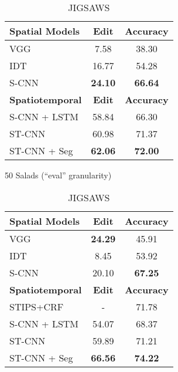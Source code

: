 \documentclass[runningheads]{llncs}
\begin{document}
\setcounter{table}{0}
\begin{table}[t]
\begin{minipage}[t]{0.5\linewidth}
		\begin{center}
\begin{tabular}{| l | c | c |}
				\hline
				\textbf{Spatial Models}  & \textbf{Edit} & \textbf{Accuracy}\\
				\hline              
				VGG   & 7.58 & 38.30 \\ 				
				IDT   & 16.77 & 54.28 \\   
				S-CNN  & \textbf{24.10} & \textbf{66.64}\\
\hline 
				\textbf{Spatiotemporal}  & \textbf{Edit} & \textbf{Accuracy}\\	
				\hline								        
				S-CNN + LSTM  & 58.84 & 66.30 \\ 
ST-CNN  & 60.98 & 71.37 \\ 
				ST-CNN + Seg  &\textbf{62.06} & \textbf{72.00}\\ 
				\hline
			\end{tabular}
			\caption{50 Salads (``eval'' granularity)}
			\label{table:salads}
		\end{center}
	\end{minipage}
\begin{minipage}[t]{0.5\linewidth}
		\begin{center}
\begin{tabular}{| l | c | c |}
				\hline
				\textbf{Spatial Models}  & \textbf{Edit} & \textbf{Accuracy}\\
				\hline          
				VGG 		& \textbf{24.29} & 45.91 \\
				IDT           & 8.45 & 53.92 \\
S-CNN  & 20.10 & \textbf{67.25}\\
				\hline 
				\textbf{Spatiotemporal}  & \textbf{Edit} & \textbf{Accuracy}\\				
				\hline				
				\cite{tao_miccai_2013} STIPS+CRF  & -& 71.78 \\                 
S-CNN + LSTM  & 54.07 & 68.37\\               
ST-CNN &  59.89 & 71.21\\
				ST-CNN + Seg &  \textbf{66.56} & \textbf{74.22}\\
\hline
			\end{tabular}
		\end{center}
		\caption{JIGSAWS}
		\label{table:jigsaws}
	\end{minipage}
	\\

\end{table}
\end{document}
